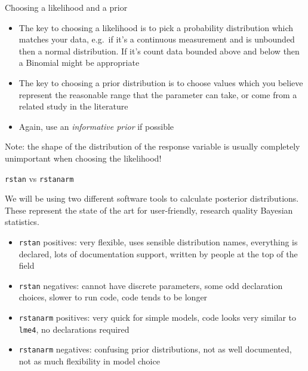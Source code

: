 \documentclass[ignorenonframetext,]{beamer}
\providecommand{\tightlist}{%
  \setlength{\itemsep}{0pt}\setlength{\parskip}{0pt}}
\begin{document}
\begin{frame}{Choosing a likelihood and a prior}

\begin{itemize}
\tightlist
\item
  The key to choosing a likelihood is to pick a probability distribution
  which matches your data, e.g.~if it's a continuous measurement and is
  unbounded then a normal distribution. If it's count data bounded above
  and below then a Binomial might be appropriate
\item
  The key to choosing a prior distribution is to choose values which you
  believe represent the reasonable range that the parameter can take, or
  come from a related study in the literature
\item
  Again, use an \emph{informative prior} if possible
\end{itemize}

Note: the shape of the distribution of the response variable is usually
completely unimportant when choosing the likelihood!

\end{frame}

\begin{frame}[fragile]{\texttt{rstan} vs \texttt{rstanarm}}

We will be using two different software tools to calculate posterior
distributions. These represent the state of the art for user-friendly,
research quality Bayesian statistics.

\begin{itemize}
\tightlist
\item
  \texttt{rstan} positives: very flexible, uses sensible distribution
  names, everything is declared, lots of documentation support, written
  by people at the top of the field
\item
  \texttt{rstan} negatives: cannot have discrete parameters, some odd
  declaration choices, slower to run code, code tends to be longer
\item
  \texttt{rstanarm} positives: very quick for simple models, code looks
  very similar to \texttt{lme4}, no declarations required
\item
  \texttt{rstanarm} negatives: confusing prior distributions, not as
  well documented, not as much flexibility in model choice
\end{itemize}

\end{frame}
\end{document}
